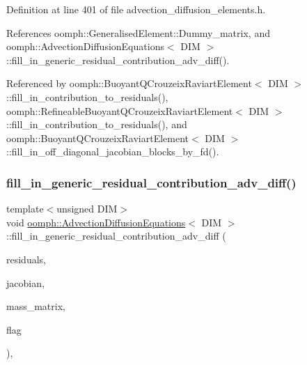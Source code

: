 Definition at line 401 of file advection\+\_\+diffusion\+\_\+elements.\+h.



References oomph\+::\+Generalised\+Element\+::\+Dummy\+\_\+matrix, and oomph\+::\+Advection\+Diffusion\+Equations$<$ D\+I\+M $>$\+::fill\+\_\+in\+\_\+generic\+\_\+residual\+\_\+contribution\+\_\+adv\+\_\+diff().



Referenced by oomph\+::\+Buoyant\+Q\+Crouzeix\+Raviart\+Element$<$ D\+I\+M $>$\+::fill\+\_\+in\+\_\+contribution\+\_\+to\+\_\+residuals(), oomph\+::\+Refineable\+Buoyant\+Q\+Crouzeix\+Raviart\+Element$<$ D\+I\+M $>$\+::fill\+\_\+in\+\_\+contribution\+\_\+to\+\_\+residuals(), and oomph\+::\+Buoyant\+Q\+Crouzeix\+Raviart\+Element$<$ D\+I\+M $>$\+::fill\+\_\+in\+\_\+off\+\_\+diagonal\+\_\+jacobian\+\_\+blocks\+\_\+by\+\_\+fd().

\mbox{\label{classoomph_1_1AdvectionDiffusionEquations_a399995609ea6d997496e3bcbdc5383f7}} 
\subsubsection{\texorpdfstring{fill\+\_\+in\+\_\+generic\+\_\+residual\+\_\+contribution\+\_\+adv\+\_\+diff()}{fill\_in\_generic\_residual\_contribution\_adv\_diff()}}
{\footnotesize\ttfamily template$<$unsigned D\+IM$>$ \\
void \hyperlink{classoomph_1_1AdvectionDiffusionEquations}{oomph\+::\+Advection\+Diffusion\+Equations}$<$ D\+IM $>$\+::fill\+\_\+in\+\_\+generic\+\_\+residual\+\_\+contribution\+\_\+adv\+\_\+diff (\begin{DoxyParamCaption}\item[{\hyperlink{classoomph_1_1Vector}{Vector}$<$ double $>$ \&}]{residuals,  }\item[{\hyperlink{classoomph_1_1DenseMatrix}{Dense\+Matrix}$<$ double $>$ \&}]{jacobian,  }\item[{\hyperlink{classoomph_1_1DenseMatrix}{Dense\+Matrix}$<$ double $>$ \&}]{mass\+\_\+matrix,  }\item[{unsigned}]{flag }\end{DoxyParamCaption})\hspace{0.3cm}{\ttfamily [protected]}, {\ttfamily [virtual]}}



